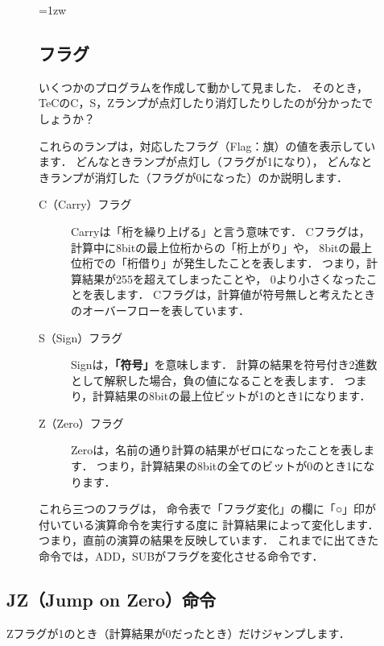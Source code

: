 \begin{figure}[btp]
\begin{framed}{\parindent=1zw
\subsection*{フラグ}
いくつかのプログラムを作成して動かして見ました．
そのとき，
TeCのC，S，Zランプが点灯したり消灯したりしたのが分かったでしょうか？

これらのランプは，対応したフラグ（Flag：旗）の値を表示しています．
どんなときランプが点灯し（フラグが1になり），
どんなときランプが消灯した（フラグが0になった）のか説明します．

\begin{description}
\item[C（Carry）フラグ]
Carryは「桁を繰り上げる」と言う意味です．
Cフラグは，
計算中に8bitの最上位桁からの「桁上がり」や，
8bitの最上位桁での「桁借り」が発生したことを表します．
つまり，計算結果が255を超えてしまったことや，
0より小さくなったことを表します．
Cフラグは，計算値が符号無しと考えたときのオーバーフローを表しています．
\item [S（Sign）フラグ]
Signは，{\bf 「符号」}を意味します．
計算の結果を符号付き2進数として解釈した場合，負の値になることを表します．
つまり，計算結果の8bitの最上位ビットが1のとき1になります．
\item [Z（Zero）フラグ]
Zeroは，名前の通り計算の結果がゼロになったことを表します．
つまり，計算結果の8bitの全てのビットが0のとき1になります．
\end{description}

これら三つのフラグは，
命令表で「フラグ変化」の欄に「○」印が付いている演算命令を実行する度に
計算結果によって変化します．
つまり，直前の演算の結果を反映しています．
これまでに出てきた命令では，ADD，SUBがフラグを変化させる命令です．
}\end{framed}
\end{figure}

\newpage
\subsection{JZ（Jump on Zero）命令}
Zフラグが1のとき（計算結果が0だったとき）だけジャンプします．

